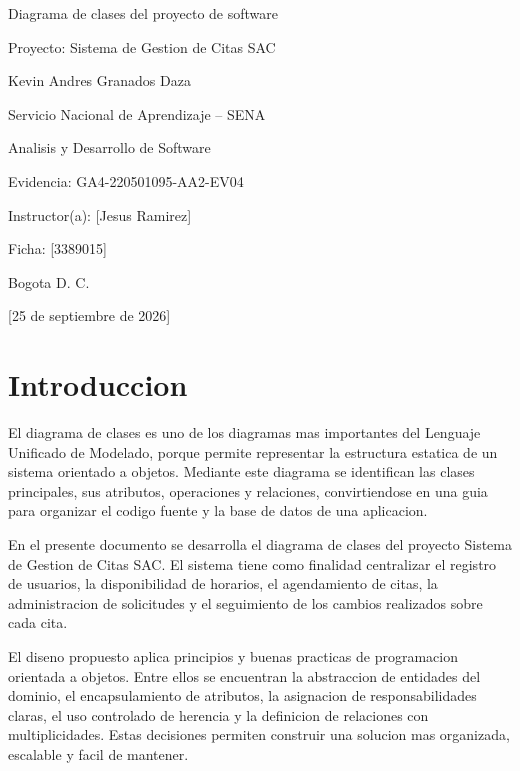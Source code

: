 \documentclass[12pt,letterpaper]{article}
\newcommand{\institucion}{Servicio Nacional de Aprendizaje -- SENA}
\newcommand{\programa}{Analisis y Desarrollo de Software}
\newcommand{\tituloTrabajo}{Diagrama de clases del proyecto de software}
\newcommand{\codigoEvidencia}{GA4-220501095-AA2-EV04}
\newcommand{\nombreProyecto}{Sistema de Gestion de Citas SAC}
\newcommand{\aprendiz}{Kevin Andres Granados Daza}
\newcommand{\instructor}{[Jesus Ramirez]}
\newcommand{\ficha}{[3389015]}
\newcommand{\ciudad}{Bogota D. C.}
\newcommand{\fechaEntrega}{[25 de septiembre de 2026]}
\begin{document}
\begin{titlepage}
    \centering
    \vspace*{2.5cm}
    {\Large \tituloTrabajo\par}
    \vspace{0.8cm}
    {\large Proyecto: \nombreProyecto\par}
    \vfill
    {\large \aprendiz\par}
    \vspace{1.5cm}
    {\large \institucion\par}
    {\large \programa\par}
    \vspace{1cm}
    {\large Evidencia: \codigoEvidencia\par}
    \vspace{1cm}
    {\large Instructor(a): \instructor\par}
    {\large Ficha: \ficha\par}
    \vfill
    {\large \ciudad\par}
    {\large \fechaEntrega\par}
\end{titlepage}

\section{Introduccion}

El diagrama de clases es uno de los diagramas mas importantes del Lenguaje Unificado de Modelado, porque permite representar la estructura estatica de un sistema orientado a objetos. Mediante este diagrama se identifican las clases principales, sus atributos, operaciones y relaciones, convirtiendose en una guia para organizar el codigo fuente y la base de datos de una aplicacion.

En el presente documento se desarrolla el diagrama de clases del proyecto \nombreProyecto. El sistema tiene como finalidad centralizar el registro de usuarios, la disponibilidad de horarios, el agendamiento de citas, la administracion de solicitudes y el seguimiento de los cambios realizados sobre cada cita.

El diseno propuesto aplica principios y buenas practicas de programacion orientada a objetos. Entre ellos se encuentran la abstraccion de entidades del dominio, el encapsulamiento de atributos, la asignacion de responsabilidades claras, el uso controlado de herencia y la definicion de relaciones con multiplicidades. Estas decisiones permiten construir una solucion mas organizada, escalable y facil de mantener.
\end{document}
